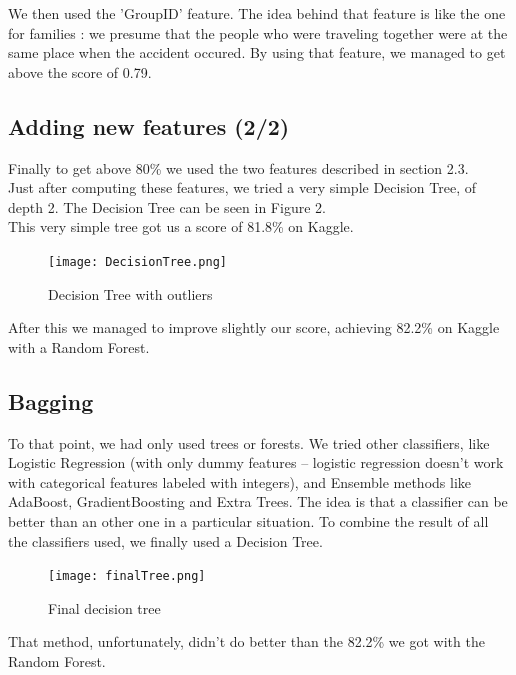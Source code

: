 \documentclass[a4paper,10pt]{article}
\begin{document}
We then used the 'GroupID' feature. The idea behind that feature is like the one for families : we presume that the people who were traveling together were at the same place when the accident occured. By using that feature, we managed
to get above the score of 0.79.

\subsection{Adding new features (2/2)}

Finally to get above 80\% we used the two features described in section 2.3. \\

Just after computing these features, we tried a very simple Decision Tree, of depth 2. The Decision Tree can be seen in Figure 2. \\

This very simple tree got us a score of 81.8\% on Kaggle.

 \newpage

\begin{figure}[h!]
  \centering 
    
      \texttt{[image: DecisionTree.png]}
  \caption{Decision Tree with outliers}
\end{figure}

After this we managed to improve slightly our score, achieving 82.2\% on Kaggle with a Random Forest.


\subsection{Bagging}

To that point, we had only used trees or forests. We tried other classifiers, like Logistic Regression (with only dummy features -- logistic regression doesn't work with categorical features labeled with integers), and Ensemble methods like AdaBoost, GradientBoosting and Extra Trees. The idea is that a classifier can be better than an other one in a particular situation. To combine the result of all the classifiers used, we finally 
used a Decision Tree.

\begin{figure}[h!]
  \centering
    
      \texttt{[image: finalTree.png]}
  \caption{Final decision tree}
\end{figure}

That method, unfortunately, didn't do better than the 82.2\% we got with the Random Forest.
\end{document}
